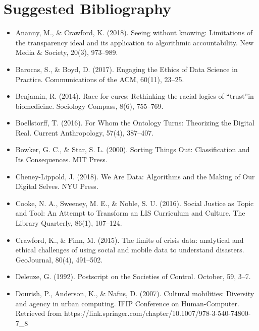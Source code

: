 \documentclass[a4paper,man,natbib]{apa6}
\begin{document}
   \section{Suggested Bibliography}

   \begin{itemize}[label={},itemindent=-2em,leftmargin=2em]
   \item Ananny, M., \& Crawford, K. (2018). Seeing without knowing: Limitations of the transparency ideal and its application to algorithmic accountability. New Media \& Society, 20(3), 973–989.

   \item Barocas, S., \& Boyd, D. (2017). Engaging the Ethics of Data Science in Practice. Communications of the ACM, 60(11), 23–25.

   \item Benjamin, R. (2014). Race for cures: Rethinking the racial logics of “trust”in biomedicine. Sociology Compass, 8(6), 755–769.

   \item Boellstorff, T. (2016). For Whom the Ontology Turns: Theorizing the Digital Real. Current Anthropology, 57(4), 387–407.

   \item Bowker, G. C., \& Star, S. L. (2000). Sorting Things Out: Classification and Its Consequences. MIT Press.

   \item Cheney-Lippold, J. (2018). We Are Data: Algorithms and the Making of Our Digital Selves. NYU Press.

   \item Cooke, N. A., Sweeney, M. E., \& Noble, S. U. (2016). Social Justice as Topic and Tool: An Attempt to Transform an LIS Curriculum and Culture. The Library Quarterly, 86(1), 107–124.

   \item Crawford, K., \& Finn, M. (2015). The limits of crisis data: analytical and ethical challenges of using social and mobile data to understand disasters. GeoJournal, 80(4), 491–502.

   \item Deleuze, G. (1992). Postscript on the Societies of Control. October, 59, 3–7.

   \item Dourish, P., Anderson, K., \& Nafus, D. (2007). Cultural mobilities: Diversity and agency in urban computing. IFIP Conference on Human-Computer. Retrieved from https://link.springer.com/chapter/10.1007/978-3-540-74800-7\_8


\end{itemize}
\end{document}
